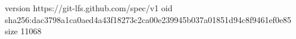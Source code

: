 version https://git-lfs.github.com/spec/v1
oid sha256:dac3798a1ca0aed4a43f18273c2ca00e239945b037a01851d94c8f9461ef0e85
size 11068
